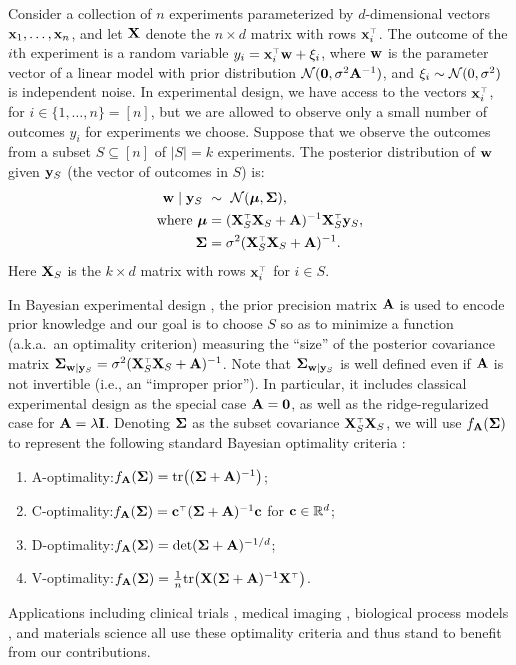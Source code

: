 \documentclass[thesis.tex]{subfiles}
\begin{document}
Consider a collection of $n$ experiments parameterized by
$d$-dimensional vectors $\mathbf x_1,\dots,\mathbf x_n$, and let $\mathbf X$ denote the
$n\times d$ matrix with rows $\x_i^\top$. The outcome of the $i$th
experiment is a random variable $y_i = \x_i^\top\w + \xi_i$, where
$\mathbf w$ is the parameter vector of a linear model with prior distribution
$\mathcal{N}(\mathbf 0,\sigma^2\mathbf A^{-1})$, and $\xi_i\sim \mathcal{N}(0,\sigma^2)$ is
independent noise. In experimental design, we have access to the vectors 
$\x_i^\top$, for $i\in\{1,\ldots,n\} = [n]$, but we are allowed to
observe only a small number of outcomes $y_i$ for experiments we choose.
Suppose that we observe the outcomes from a subset
$S\subseteq [n]$ of $\lvert S \vert = k$ experiments. The
posterior distribution of $\mathbf w$ given $\mathbf y_S$ (the vector of outcomes in $S$) is:
\begin{align*}
  \w\mid \y_S \ &\sim\ \Nc(\mub, \Sigmab), \\
  \text{where } \mub &= (\X_S^\top\X_S + \A)^{-1}\X_S^\top\y_S, \\
  \Sigmab &= \sigma^2(\X_S^\top\X_S+\A)^{-1}.
\end{align*}
Here $\mathbf X_S$ is the $k\times d$ matrix with rows $\x_i^\top$ for
$i\in S$.

In Bayesian experimental design \citep{bayesian-design-review},
the prior precision matrix $\mathbf A$ is used to encode prior knowledge
and our goal is to choose $S$ so as to 
  minimize a function (a.k.a.~an optimality criterion) measuring the ``size''
  of the posterior covariance matrix
  $\Sigmab_{\w\mid\y_S} = \sigma^2(\X_S^\top\X_S+\A)^{-1}$.
Note that $\mathbf{\Sigma}_{\mathbf w\mid\mathbf y_S}$ is well defined even if $\mathbf A$ is not
invertible (i.e., an ``improper prior''). In particular, it includes classical
experimental design as the special case $\mathbf A = \mathbf 0$, as well as
the ridge-regularized case for $\mathbf A=\lambda\mathbf I$.
Denoting $\mathbf{\Sigma}$ as the subset covariance $\X_S^\top\X_S$, we will
use $f_{\mathbf A}(\mathbf{\Sigma})$ to represent the following standard Bayesian 
optimality criteria \citep{bayesian-design-review,optimal-design-pukelsheim}:
\begin{enumerate}
\item A-optimality:\quad $f_{\mathbf A}(\mathbf{\Sigma}) = \mathrm{tr}\big((\mathbf{\Sigma}+\mathbf A)^{-1}\big)$;
\item C-optimality:\quad \!\!$f_{\A}(\Sigmab) = \cb^\top(\Sigmab+\A)^{-1}\cb$ for
$\mathbf{c} \in \mathbb R^d$;
\item D-optimality:\quad $f_{\mathbf A}(\mathbf{\Sigma}) = \det(\mathbf{\Sigma}+\mathbf A)^{-1/d}$;
  \item V-optimality:\quad $f_{\A}(\Sigmab) =
    \frac1n\tr\big(\X(\Sigmab+\A)^{-1}\X^\top\big)$.
  \end{enumerate}
  Applications including clinical trials
  \citep{ryan2015fully,ding2008bayesian,spiegelhalter2004incorporating,berry2002adaptive,stangl1998bayesian,flournoy1993clinical},
  medical imaging \citep{owen2016optimisation},
  biological process models \citep{ryan2016optimal},
  and materials science
  \citep{frazier2016bayesian,ueno2016combo,terejanu2012bayesian}
  all use these optimality criteria and thus stand to benefit from
  our contributions.
\end{document}
